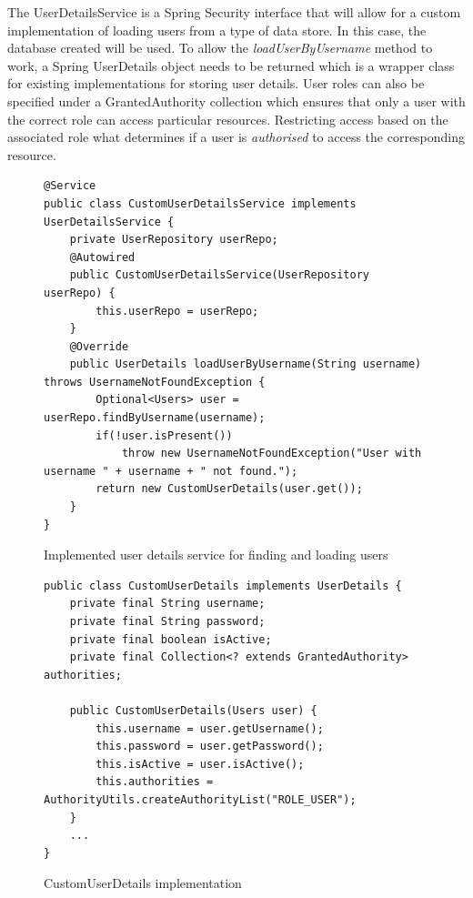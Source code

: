 The UserDetailsService is a Spring Security interface that will allow for a custom implementation of loading users from a type of data store.
In this case, the database created will be used.
To allow the \textit{loadUserByUsername} method to work, a Spring UserDetails object needs to be returned which is a wrapper class for
existing implementations for storing user details.
User roles can also be specified under a GrantedAuthority collection which ensures that only a user with the correct role can 
access particular resources.
Restricting access based on the associated role what determines if a user is \textit{authorised} to access the corresponding resource.

\clearpage
\begin{figure}[ht]
    \centering
    \begin{lstlisting}
@Service
public class CustomUserDetailsService implements UserDetailsService {
    private UserRepository userRepo;
    @Autowired
    public CustomUserDetailsService(UserRepository userRepo) {
        this.userRepo = userRepo;
    }
    @Override
    public UserDetails loadUserByUsername(String username) throws UsernameNotFoundException {
        Optional<Users> user = userRepo.findByUsername(username);
        if(!user.isPresent())
            throw new UsernameNotFoundException("User with username " + username + " not found.");
        return new CustomUserDetails(user.get());
    }
}
    \end{lstlisting}
    \caption{Implemented user details service for finding and loading users}
    \label{userdetailsservice}
\end{figure}

\begin{figure}[ht]
    \centering
    \begin{lstlisting}
public class CustomUserDetails implements UserDetails {
    private final String username;
    private final String password;
    private final boolean isActive;
    private final Collection<? extends GrantedAuthority> authorities;

    public CustomUserDetails(Users user) {
        this.username = user.getUsername();
        this.password = user.getPassword();
        this.isActive = user.isActive();
        this.authorities = AuthorityUtils.createAuthorityList("ROLE_USER");
    }
    ...
}
    \end{lstlisting}
    \caption{CustomUserDetails implementation}
    \label{userdetailswrapper}
\end{figure}


